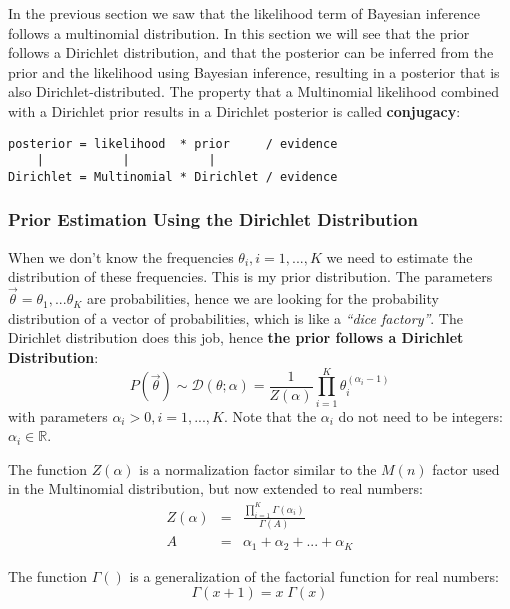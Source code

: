 In the previous section we saw that the likelihood term of Bayesian inference follows a multinomial distribution. In this section we will see that the prior follows a Dirichlet distribution, and that the posterior can be inferred from the prior and the likelihood using Bayesian inference, resulting in a posterior that is also Dirichlet-distributed. The property that a Multinomial likelihood combined with a Dirichlet prior results in a Dirichlet posterior is called {\bf conjugacy}:

\begin{verbatim}
posterior = likelihood  * prior     / evidence
    |           |           | 
Dirichlet = Multinomial * Dirichlet / evidence
\end{verbatim}

\subsubsection{Prior Estimation Using the Dirichlet Distribution}
\label{sec:prior:dirichlet}

When we don't know the frequencies $\theta_i, i=1,...,K$ we need to estimate the distribution of these frequencies. This is my prior distribution. The parameters $\vec{\theta} = \theta_1, ... \theta_K$ are probabilities, hence we are looking for the probability distribution of a vector of probabilities, which is like a {\em ``dice factory''}. The Dirichlet distribution does this job, hence {\bf the prior follows a Dirichlet Distribution}:
%
\begin{equation}
P(\vec{\theta}) \sim \mathcal{D}(\theta ; \alpha) = 
\frac{1}{Z(\alpha)} \prod_{i=1}^K \theta_i ^ {(\alpha_i - 1)}
\end{equation}
with parameters $\alpha_i > 0, i=1,...,K$. Note that the $\alpha_i$ do not need to be integers: $\alpha_i \in \mathbb{R}$.

The function $Z(\alpha)$ is a normalization factor similar to the $M(n)$ factor used in the Multinomial distribution, but now extended to real numbers:
%
\begin{eqnarray}
Z(\alpha) & = & \frac{\prod_{i=1}^K \Gamma(\alpha_i) }{\Gamma(A)} \\
A & = & \alpha_1 + \alpha_2 + ... + \alpha_K
\end{eqnarray}

The function $\Gamma()$ is a generalization of the factorial function for real numbers:
\begin{equation}
\Gamma(x + 1) = x \; \Gamma(x)
\end{equation}

